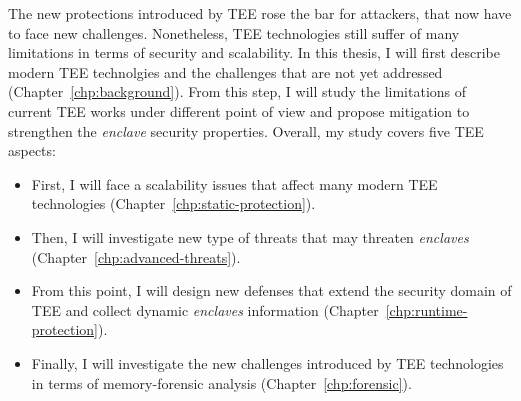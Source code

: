 The new protections introduced by TEE rose the bar for attackers, that now have 
to face new challenges.
Nonetheless, TEE technologies still suffer of many limitations in terms of 
security and scalability.
In this thesis, I will first describe modern TEE technolgies and the challenges 
that are not yet addressed (Chapter~\ref{chp:background}).
From this step, I will study the limitations of current TEE works under 
different point of view and propose mitigation to strengthen the 
\emph{enclave} security properties.
Overall, my study covers five TEE aspects:
\begin{itemize}
	\item {} First, I will face a 
	scalability issues that affect many modern	TEE technologies 
	(Chapter~\ref{chp:static-protection}).
	\item {} Then, I will investigate new type of threats that 
	may threaten \emph{enclaves} (Chapter~\ref{chp:advanced-threats}).
	\item {} From this point, I will design new defenses that 
	extend the security domain of TEE and collect dynamic \emph{enclaves} 
	information (Chapter~\ref{chp:runtime-protection}).
	\item {} Finally, I will investigate the new 
	challenges introduced by TEE technologies in terms of memory-forensic 
	analysis (Chapter~\ref{chp:forensic}).
\end{itemize}

